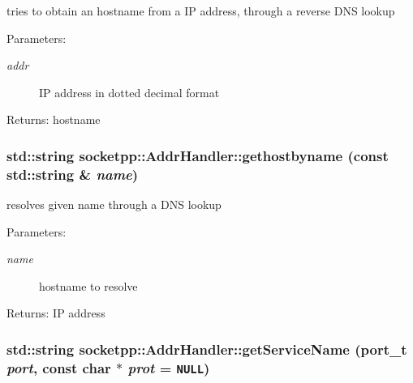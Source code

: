 tries to obtain an hostname from a IP address, through a reverse DNS lookup 

\begin{Desc}
\item[Parameters:]
\begin{description}
\item[{\em addr}]IP address in dotted decimal format \end{description}
\end{Desc}
\begin{Desc}
\item[Returns:]hostname \end{Desc}
\hypertarget{classsocketpp_1_1AddrHandler_19aebc1e9779dee4e5f06d7b39e18959}{
\subsubsection[{gethostbyname}]{\setlength{\rightskip}{0pt plus 5cm}std::string socketpp::AddrHandler::gethostbyname (const std::string \& {\em name})}}
\label{classsocketpp_1_1AddrHandler_19aebc1e9779dee4e5f06d7b39e18959}


resolves given name through a DNS lookup 

\begin{Desc}
\item[Parameters:]
\begin{description}
\item[{\em name}]hostname to resolve \end{description}
\end{Desc}
\begin{Desc}
\item[Returns:]IP address \end{Desc}
\hypertarget{classsocketpp_1_1AddrHandler_9c31dc05f530871b779a52f49adeb6b6}{
\subsubsection[{getServiceName}]{\setlength{\rightskip}{0pt plus 5cm}std::string socketpp::AddrHandler::getServiceName ({\bf port\_\-t} {\em port}, \/  const char $\ast$ {\em prot} = {\tt NULL})}}
\label{classsocketpp_1_1AddrHandler_9c31dc05f530871b779a52f49adeb6b6}


